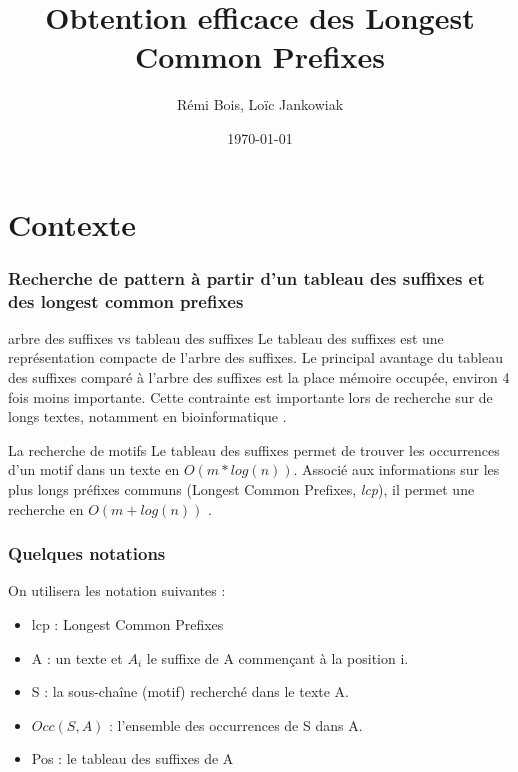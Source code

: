 \documentclass[10pt]{beamer}
\title{Obtention efficace des Longest Common Prefixes}
\author{Rémi Bois, Loïc Jankowiak}
\date{\today}
\begin{document}
\begin{frame}
  \maketitle

\end{frame}

\begin{frame}
  \tableofcontents
\end{frame}

\section{Contexte}
\label{sec:context}



\begin{frame}
  \frametitle{Recherche de pattern à partir d'un tableau des suffixes
    et des longest common prefixes}

  \begin{block}{arbre des suffixes vs tableau des suffixes} 
    Le tableau des suffixes est une représentation compacte de l'arbre
    des suffixes. Le principal avantage du tableau des suffixes comparé à
    l'arbre des suffixes est la place mémoire occupée, environ 4 fois
    moins importante. Cette contrainte est importante lors de
    recherche sur de longs textes, notamment en bioinformatique \cite{Raffinot11}.
  \end{block}

  \pause

  \begin{block}{La recherche de motifs}
    Le tableau des suffixes permet de trouver les occurrences d'un
    motif dans un texte en $O(m*log(n))$. Associé aux informations sur
    les plus longs préfixes communs (Longest Common Prefixes,
    \emph{lcp}), il permet une recherche en $O(m + log(n))$ \cite{Manber93}.
  \end{block}
  
\end{frame}

\begin{frame}
  \frametitle{Quelques notations}
  On utilisera les notation suivantes :

  \begin{itemize}
  \item lcp : Longest Common Prefixes
  \item A : un texte et $A_i$ le suffixe de A commençant à la position i.
  \item S : la sous-chaîne (motif) recherché dans le texte A.
  \item $Occ(S, A)$ : l'ensemble des occurrences de S dans A.
  \item Pos : le tableau des suffixes de A
  \end{itemize}
\end{frame}
\end{document}
